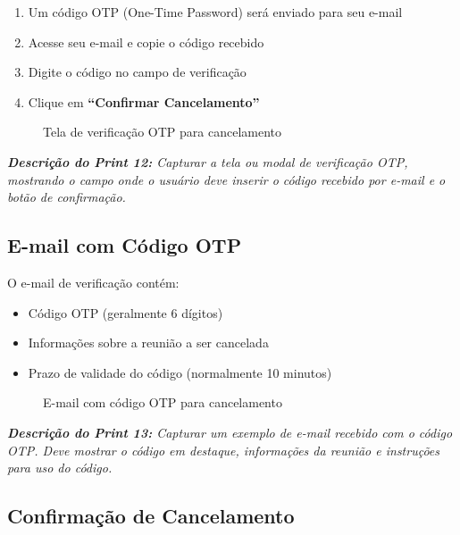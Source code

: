 \documentclass[12pt,a4paper]{article}
\begin{document}
\begin{enumerate}[leftmargin=*]
    \item Um código OTP (One-Time Password) será enviado para seu e-mail
    \item Acesse seu e-mail e copie o código recebido
    \item Digite o código no campo de verificação
    \item Clique em \textbf{``Confirmar Cancelamento''}
\end{enumerate}

\begin{figure}[H]
    \centering
    \caption{Tela de verificação OTP para cancelamento}
    \label{fig:otp}
\end{figure}

\textit{\textbf{Descrição do Print 12:} Capturar a tela ou modal de verificação OTP, mostrando o campo onde o usuário deve inserir o código recebido por e-mail e o botão de confirmação.}

\newpage

\subsection{E-mail com Código OTP}

O e-mail de verificação contém:

\begin{itemize}[leftmargin=*]
    \item Código OTP (geralmente 6 dígitos)
    \item Informações sobre a reunião a ser cancelada
    \item Prazo de validade do código (normalmente 10 minutos)
\end{itemize}

\begin{figure}[H]
    \centering
    \caption{E-mail com código OTP para cancelamento}
    \label{fig:email_otp}
\end{figure}

\textit{\textbf{Descrição do Print 13:} Capturar um exemplo de e-mail recebido com o código OTP. Deve mostrar o código em destaque, informações da reunião e instruções para uso do código.}

\subsection{Confirmação de Cancelamento}
\end{document}
